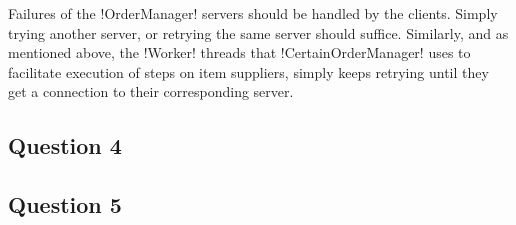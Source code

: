 \documentclass[a4paper, 12pt]{article}
\begin{document}
Failures of the !OrderManager! servers should be handled by the
clients. Simply trying another server, or retrying the same server
should suffice. Similarly, and as mentioned above, the !Worker!
threads that !CertainOrderManager! uses to facilitate execution of
steps on item suppliers, simply keeps retrying until they get a
connection to their corresponding server.


\subsection*{Question 4}






\subsection*{Question 5}

\end{document}
